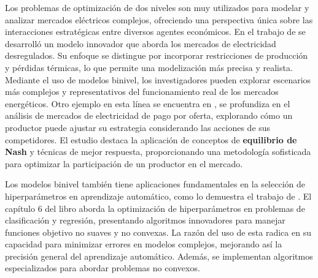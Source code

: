 Los problemas de optimización de dos niveles son muy utilizados para modelar y analizar mercados eléctricos complejos, ofreciendo una perspectiva única sobre las interacciones estratégicas entre diversos agentes económicos.
En el trabajo de  \cite{Aussel2016DeregulatedEM} se desarrolló un modelo innovador que aborda los mercados de electricidad desregulados. Su enfoque se distingue por incorporar restricciones de producción y pérdidas térmicas, lo que permite una modelización más precisa y realista. Mediante el uso de modelos binivel, los investigadores pueden explorar escenarios más complejos y representativos del funcionamiento real de los mercados energéticos.
Otro ejemplo en esta línea se encuentra en \cite{Aussel2017NashEI}, se profundiza en el análisis de mercados de electricidad de pago por oferta, explorando cómo un productor puede ajustar su estrategia considerando las acciones de sus competidores. El estudio destaca la aplicación de conceptos de \textbf{equilibrio de Nash} y técnicas de mejor respuesta, proporcionando una metodología sofisticada para optimizar la participación de un productor en el mercado.


Los modelos binivel también tiene aplicaciones fundamentales en la selección de hiperparámetros en aprendizaje automático, como lo demuestra el trabajo de \cite{DempeyZemkoho2020ML}. El capítulo 6 del libro aborda la optimización de hiperparámetros en problemas de clasificación y regresión, presentando algoritmos innovadores para manejar funciones objetivo no suaves y no convexas. La razón del uso de esta radica en su capacidad para minimizar errores en modelos complejos, mejorando así la precisión general del aprendizaje automático. Además, se implementan algoritmos especializados para abordar problemas no convexos.

